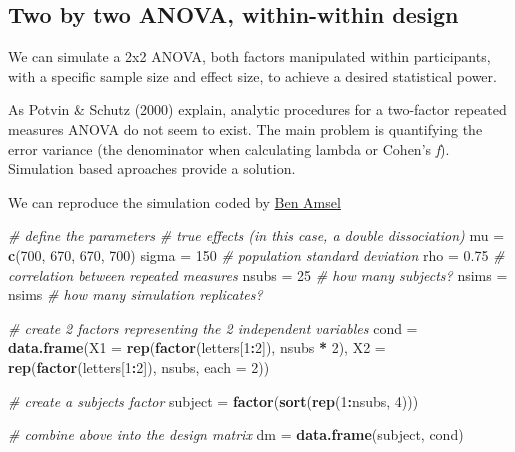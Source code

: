 \documentclass[]{book}
\newenvironment{Shaded}{\begin{snugshade}}{\end{snugshade}}
\newcommand{\CommentTok}[1]{\textcolor[rgb]{0.56,0.35,0.01}{\textit{#1}}}
\newcommand{\DataTypeTok}[1]{\textcolor[rgb]{0.13,0.29,0.53}{#1}}
\newcommand{\DecValTok}[1]{\textcolor[rgb]{0.00,0.00,0.81}{#1}}
\newcommand{\FloatTok}[1]{\textcolor[rgb]{0.00,0.00,0.81}{#1}}
\newcommand{\KeywordTok}[1]{\textcolor[rgb]{0.13,0.29,0.53}{\textbf{#1}}}
\newcommand{\NormalTok}[1]{#1}
\newcommand{\OperatorTok}[1]{\textcolor[rgb]{0.81,0.36,0.00}{\textbf{#1}}}
\newcommand{\StringTok}[1]{\textcolor[rgb]{0.31,0.60,0.02}{#1}}
\begin{document}
\hypertarget{two-by-two-anova-within-within-design}{%
\subsection{Two by two ANOVA, within-within design}\label{two-by-two-anova-within-within-design}}

We can simulate a 2x2 ANOVA, both factors manipulated within participants, with a specific sample size and effect size, to achieve a desired statistical power.

As Potvin \& Schutz (2000) explain, analytic procedures for a two-factor repeated measures ANOVA do not seem to exist. The main problem is quantifying the error variance (the denominator when calculating lambda or Cohen's \emph{f}). Simulation based aproaches provide a solution.

We can reproduce the simulation coded by \href{https://cognitivedatascientist.com/2015/12/14/power-simulation-in-r-the-repeated-measures-anova-5/}{Ben Amsel}

\begin{Shaded}
\begin{Highlighting}[]
\CommentTok{# define the parameters}
\CommentTok{# true effects (in this case, a double dissociation)}
\NormalTok{mu =}\StringTok{ }\KeywordTok{c}\NormalTok{(}\DecValTok{700}\NormalTok{, }\DecValTok{670}\NormalTok{, }\DecValTok{670}\NormalTok{, }\DecValTok{700}\NormalTok{) }
\NormalTok{sigma =}\StringTok{ }\DecValTok{150}  \CommentTok{# population standard deviation}
\NormalTok{rho =}\StringTok{ }\FloatTok{0.75} \CommentTok{# correlation between repeated measures}
\NormalTok{nsubs =}\StringTok{ }\DecValTok{25} \CommentTok{# how many subjects?}
\NormalTok{nsims =}\StringTok{ }\NormalTok{nsims }\CommentTok{# how many simulation replicates?}
 
\CommentTok{# create 2 factors representing the 2 independent variables}
\NormalTok{cond =}\StringTok{ }\KeywordTok{data.frame}\NormalTok{(}\DataTypeTok{X1 =} \KeywordTok{rep}\NormalTok{(}\KeywordTok{factor}\NormalTok{(letters[}\DecValTok{1}\OperatorTok{:}\DecValTok{2}\NormalTok{]), nsubs }\OperatorTok{*}\StringTok{ }\DecValTok{2}\NormalTok{),}
                  \DataTypeTok{X2 =} \KeywordTok{rep}\NormalTok{(}\KeywordTok{factor}\NormalTok{(letters[}\DecValTok{1}\OperatorTok{:}\DecValTok{2}\NormalTok{]), nsubs, }\DataTypeTok{each =} \DecValTok{2}\NormalTok{))}
 
\CommentTok{# create a subjects factor}
\NormalTok{subject =}\StringTok{ }\KeywordTok{factor}\NormalTok{(}\KeywordTok{sort}\NormalTok{(}\KeywordTok{rep}\NormalTok{(}\DecValTok{1}\OperatorTok{:}\NormalTok{nsubs, }\DecValTok{4}\NormalTok{)))}
 
\CommentTok{# combine above into the design matrix}
\NormalTok{dm =}\StringTok{ }\KeywordTok{data.frame}\NormalTok{(subject, cond)}
\end{Highlighting}
\end{Shaded}
\end{document}

